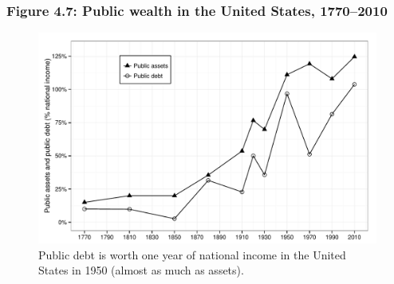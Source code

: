 \documentclass[t]{beamer}\usepackage[]{graphicx}\usepackage[]{color}
\newenvironment{knitrout}{}{} %
\begin{document}
\begin{frame}[label=Figure_4_7]
\frametitle{Figure 4.7: Public wealth in the United States, 1770--2010}
\begin{figure}[t]
\begin{minipage}[b]{\textwidth}
\centering
\begin{knitrout}\footnotesize
{}\color{fgcolor}

{\centering \includegraphics[width=1\linewidth]{figures/bw/Figure_4_7} 

}



\end{knitrout}
\caption{Public debt is worth one year of national income in the United States in 1950 (almost as much as assets).}
\end{minipage}
\end{figure}
\end{frame}
\end{document}
